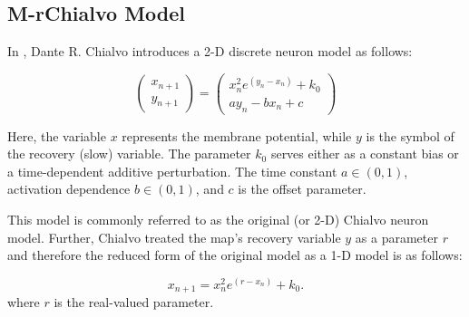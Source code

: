 \documentclass{article}
\begin{document}

  

\subsection{M-rChialvo Model } In \cite{chialvo1995generic}, Dante R. Chialvo introduces a 2-D discrete neuron model as follows:

\begin{equation}\label{2}
\left(
\begin{array}{c} 
x_{n+1}  \\ 
y_{n+1} 
\end{array} 
\right)
=
\left(
\begin{array}{c} 
x_n^2e^{(y_n-x_n)}+k_0 \\ 
ay_n-bx_n+c 
\end{array} 
\right) 
\end{equation}






\noindent Here, the variable $x$ represents the membrane potential, while $y$ is the symbol of the recovery (slow) variable. The parameter $k_0$ serves either as a constant bias or a time-dependent additive perturbation. The time constant $a\in(0,1)$, activation dependence $b\in(0,1)$, and $c$ is the offset parameter. 

This model is commonly referred to as the original (or 2-D) Chialvo neuron model. Further, Chialvo treated the map's recovery variable $y$ as a parameter $r$ and therefore the reduced form of the original model as a 1-D model is as follows:

\begin{equation}\label{3}
    x_{n+1}=x_n^2e^{(r-x_n)}+k_0.
\end{equation}
\noindent where $r$ is the real-valued parameter.
\end{document}
